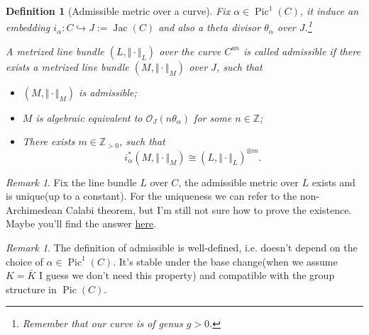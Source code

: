 \documentclass[reqno,11pt]{amsart}
\numberwithin{equation}{section}
\theoremstyle{plain}
\newtheorem{defn}[theorem]{Definition}
\theoremstyle{plain}
\numberwithin{equation}{section}
\theoremstyle{remark}
\newtheorem{remark}[theorem]{Remark}
\DeclareMathOperator{\Pic}{\operatorname{Pic}}
\DeclareMathOperator{\Jac}{\operatorname{Jac}}
\newcommand{\norm}[1]{\Vert{#1}\Vert}
\begin{document}
\begin{defn}[Admissible metric over a curve]
Fix $\alpha \in \Pic^1(C)$, it induce an embedding $i_{\alpha}:C \hookrightarrow J:=\Jac(C)$ and also a theta divisor $\theta_{\alpha}$ over $J$.\footnote{Remember that our curve is of genus $g>0$.} 

A metrized line bundle $(L,\norm{\cdot}_L)$ over the curve $C^{an}$ is called admissible if there exists a metrized line bundle $(M,\norm{\cdot}_M)$ over $J$, such that 
\begin{itemize}
\item $(M,\norm{\cdot}_M)$ is admissible;
\item $M$ is algebraic equivalent to $\mathcal{O}_J(n\theta_{\alpha})$ for some $n \in \mathbb{Z}$;
\item There exists $m \in \mathbb{Z}_{>0}$, such that $$i_{\alpha}^*(M,\norm{\cdot}_M) \cong (L,\norm{\cdot}_L)^{\otimes m}.$$
\end{itemize}
\end{defn}
\begin{center}
\end{center}
\begin{remark}
Fix the line bundle $L$ over $C$, the admissible metric over $L$ exists and is unique(up to a constant). For the uniqueness we can refer to the non-Archimedean Calabi theorem, but I'm still not sure how to prove the existence. Maybe you'll find the answer \href{http://qirui.li/main.pdf}{here}.
\end{remark}
\begin{remark}
The definition of admissible is well-defined, i.e. doesn't depend on the choice of $\alpha \in \Pic^1(C)$. It's stable under the base change(when we assume $K=\bar{K}$ I guess we don't need this property) and compatible with the group structure in $\Pic(C)$.
\end{remark}
\end{document}
